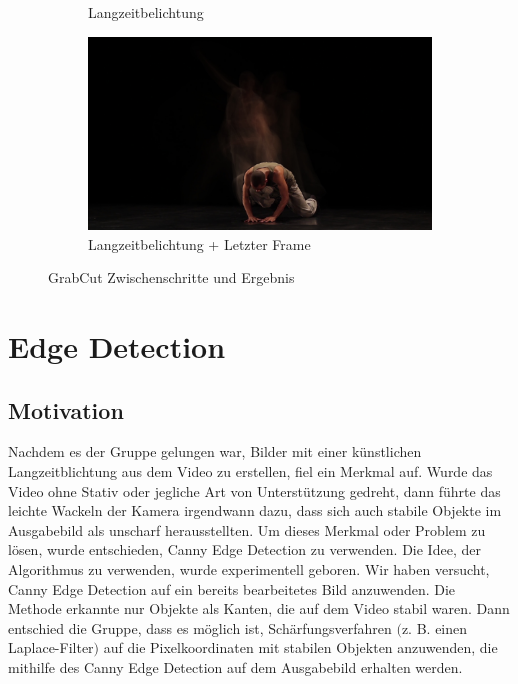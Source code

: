 \documentclass[12pt]{scrartcl}
\begin{document}
\begin{figure}[b]
\begin{subfigure}{0.5\linewidth}
		\caption{Langzeitbelichtung}
		\label{subfig:longexposure}
	\end{subfigure}
	\begin{subfigure}{0.5\linewidth}
		\includegraphics[width=\textwidth]{freeze_me_path.jpg}
		\caption{Langzeitbelichtung + Letzter Frame}
		\label{subfig:grabcutresult}
	\end{subfigure}
	\caption{GrabCut Zwischenschritte und Ergebnis}
	\label{fig:grabcutresultcomplex}
\end{figure}


\section{Edge Detection}
\subsection{Motivation}
Nachdem es der Gruppe gelungen war, Bilder mit einer k\"unstlichen Langzeitblichtung aus dem Video zu erstellen, fiel ein Merkmal auf. Wurde das Video ohne Stativ oder jegliche Art von Unterst\"utzung gedreht, dann f\"uhrte das leichte Wackeln der Kamera irgendwann dazu, dass sich auch stabile Objekte im Ausgabebild als unscharf herausstellten. Um dieses Merkmal oder Problem zu l\"osen, wurde entschieden, Canny Edge Detection zu verwenden.
Die Idee, der Algorithmus zu verwenden, wurde experimentell geboren. Wir haben versucht, Canny Edge Detection auf ein bereits bearbeitetes Bild anzuwenden. Die Methode erkannte nur Objekte als Kanten, die auf dem Video stabil waren. Dann entschied die Gruppe, dass es m\"oglich ist, Sch\"arfungsverfahren $($z. B. einen Laplace-Filter$)$ auf die Pixelkoordinaten mit stabilen Objekten anzuwenden, die mithilfe des Canny Edge Detection auf dem Ausgabebild erhalten werden.
\end{document}
